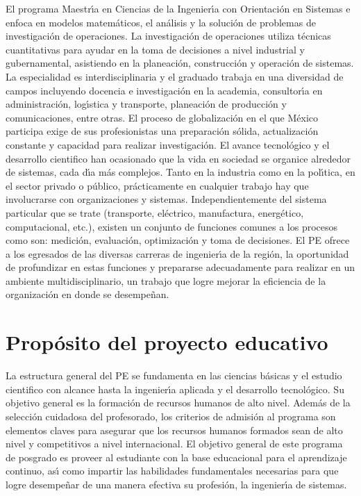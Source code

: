 \documentclass{article}
\begin{document}
El programa Maestr\'{\i}a en Ciencias de la Ingenier\'{\i}a con Orientaci\'{o}n en
Sistemas e enfoca en modelos matem\'{a}ticos, el an\'{a}lisis y la soluci\'{o}n de
problemas de investigaci\'{o}n de operaciones. La investigaci\'{o}n de
operaciones utiliza t\'{e}cnicas cuantitativas para ayudar en la toma de
decisiones a nivel industrial y gubernamental, asistiendo en la
planeaci\'{o}n, construcci\'{o}n y operaci\'{o}n de sistemas. La especialidad es
interdisciplinaria y el graduado trabaja en una diversidad de campos
incluyendo docencia e investigaci\'{o}n en la academia, consultor\'{\i}a en
administraci\'{o}n, log\'{\i}stica y transporte, planeaci\'{o}n de producci\'{o}n y
comunicaciones, entre otras.  El proceso de globalizaci\'{o}n en el que
M\'{e}xico participa exige de sus profesionistas una preparaci\'{o}n s\'{o}lida,
actualizaci\'{o}n constante y capacidad para realizar investigaci\'{o}n. El
avance tecnol\'{o}gico y el desarrollo cientifico han ocasionado que la
vida en sociedad se organice alrededor de sistemas, cada d\'{\i}a m\'{a}s
complejos. Tanto en la industria como en la pol\'{\i}tica, en el sector
privado o p\'{u}blico, pr\'{a}cticamente en cualquier trabajo hay que
involucrarse con organizaciones y sistemas. Independientemente del
sistema particular que se trate (transporte, el\'{e}ctrico, manufactura,
energ\'{e}tico, computacional, etc.), existen un conjunto de funciones
comunes a los procesos como son: medici\'{o}n, evaluaci\'{o}n, optimizaci\'{o}n y
toma de decisiones. El PE ofrece a los egresados de las diversas
carreras de ingenier\'{\i}a de la regi\'{o}n, la oportunidad de profundizar en
estas funciones y prepararse adecuadamente para realizar en un
ambiente multidisciplinario, un trabajo que logre mejorar la
eficiencia de la organizaci\'{o}n en donde se desempe\~{n}an.

\section{Prop\'{o}sito del proyecto educativo}

La estructura general del PE se fundamenta en las ciencias b\'{a}sicas y
el estudio cientifico con alcance hasta la ingenier\'{\i}a aplicada y el
desarrollo tecnol\'{o}gico. Su objetivo general es la formaci\'{o}n de
recursos humanos de alto nivel. Adem\'{a}s de la selecci\'{o}n cuidadosa del
profesorado, los criterios de admisi\'{o}n al programa son elementos
claves para asegurar que los recursos humanos formados sean de alto
nivel y competitivos a nivel internacional.  El objetivo general de
este programa de posgrado es proveer al estudiante con la base
educacional para el aprendizaje continuo, as\'{\i} como impartir las
habilidades fundamentales necesarias para que logre desempe\~{n}ar de una
manera efectiva su profesi\'{o}n, la ingenier\'{\i}a de sistemas.
\end{document}
